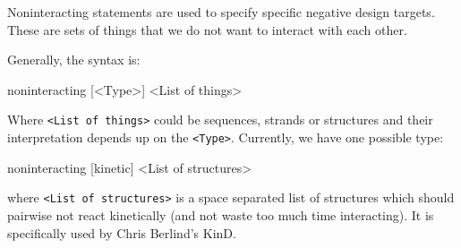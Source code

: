 \documentclass{article}
\newenvironment{code}
{\vspace{-0.1in}\par\begin{list}{}{
\setlength{\listparindent}{0pt}
\raggedright
\setlength{\itemsep}{0pt}
\setlength{\parsep}{0pt}
\normalfont\ttfamily}
 \item[]}
{\end{list}\vspace{-0.1in}}
\begin{document}
Noninteracting statements are used to specify specific negative design
targets. These are sets of things that we do not want to interact
with each other.

Generally, the syntax is:
\begin{code}
noninteracting [<Type>] <List of things>
\end{code}
Where \texttt{<List of things>} could be sequences, strands or structures and
their interpretation depends up on the \texttt{<Type>}. Currently, we have
one possible type:
\begin{code}
noninteracting [kinetic] <List of structures>
\end{code}
where \texttt{<List of structures>} is a space separated list of structures
which should pairwise not react kinetically (and not waste too much
time interacting). It is specifically used by Chris Berlind's KinD.
\end{document}
